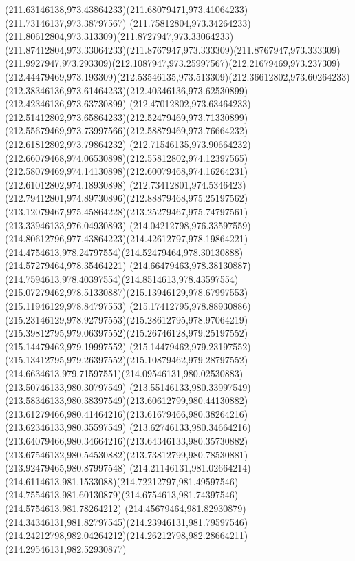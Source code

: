 {    \curveto(211.63146138,973.43864233)(211.68079471,973.41064233)(211.73146137,973.38797567)
    \curveto(211.75812804,973.34264233)(211.80612804,973.313309)(211.8727947,973.33064233)
    \curveto(211.87412804,973.33064233)(211.8767947,973.333309)(211.8767947,973.333309)
    \curveto(211.9927947,973.293309)(212.1087947,973.25997567)(212.21679469,973.237309)
    \curveto(212.44479469,973.193309)(212.53546135,973.513309)(212.36612802,973.60264233)
    \curveto(212.38346136,973.61464233)(212.40346136,973.62530899)(212.42346136,973.63730899)
    \curveto(212.47012802,973.63464233)(212.51412802,973.65864233)(212.52479469,973.71330899)
    \curveto(212.55679469,973.73997566)(212.58879469,973.76664232)(212.61812802,973.79864232)
    \curveto(212.71546135,973.90664232)(212.66079468,974.06530898)(212.55812802,974.12397565)
    \curveto(212.58079469,974.14130898)(212.60079468,974.16264231)(212.61012802,974.18930898)
    \curveto(212.73412801,974.5346423)(212.79412801,974.89730896)(212.88879468,975.25197562)
    \curveto(213.12079467,975.45864228)(213.25279467,975.74797561)(213.33946133,976.04930893)
    \curveto(214.04212798,976.33597559)(214.80612796,977.43864223)(214.42612797,978.19864221)
    \curveto(214.4754613,978.24797554)(214.52479464,978.30130888)(214.57279464,978.35464221)
    \curveto(214.66479463,978.38130887)(214.7594613,978.40397554)(214.8514613,978.43597554)
    \curveto(215.07279462,978.51330887)(215.13946129,978.67997553)(215.11946129,978.84797553)
    \curveto(215.17412795,978.88930886)(215.23146129,978.92797553)(215.28612795,978.97064219)
    \curveto(215.39812795,979.06397552)(215.26746128,979.25197552)(215.14479462,979.19997552)
    \curveto(215.14479462,979.23197552)(215.13412795,979.26397552)(215.10879462,979.28797552)
    \curveto(214.6634613,979.71597551)(214.09546131,980.02530883)(213.50746133,980.30797549)
    \curveto(213.55146133,980.33997549)(213.58346133,980.38397549)(213.60612799,980.44130882)
    \curveto(213.61279466,980.41464216)(213.61679466,980.38264216)(213.62346133,980.35597549)
    \curveto(213.62746133,980.34664216)(213.64079466,980.34664216)(213.64346133,980.35730882)
    \curveto(213.67546132,980.54530882)(213.73812799,980.78530881)(213.92479465,980.87997548)
    \curveto(214.21146131,981.02664214)(214.6114613,981.1533088)(214.72212797,981.49597546)
    \curveto(214.7554613,981.60130879)(214.6754613,981.74397546)(214.5754613,981.78264212)
    \curveto(214.45679464,981.82930879)(214.34346131,981.82797545)(214.23946131,981.79597546)
    \curveto(214.24212798,982.04264212)(214.26212798,982.28664211)(214.29546131,982.52930877)
}
